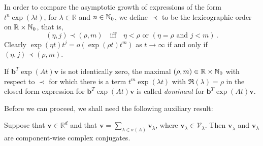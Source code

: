
In order to compare the asymptotic growth of expressions of the form
$t^{n}\exp(\lambda t)$, for $\lambda\in\mathbb{R}$ and
$n\in\mathbb{N}_0$, we define $\prec$ to be the lexicographic order on
$\mathbb{R}\times\mathbb{N}_{0}$, that is,
\begin{equation*}
(\eta,j)\prec (\rho,m) \quad \mbox{iff} \quad
\eta<\rho \mbox{ or } (\eta = \rho \mbox{ and } j< m) \, .
\end{equation*}
Clearly $\exp(\eta t)t^{j}=o(\exp(\rho t)t^{m})$ as $t\rightarrow \infty$ if and only if $(\eta,j)\prec (\rho,m)$.

\begin{definition}
If $\boldsymbol{b}^{T}\exp(At)\boldsymbol{v}$ is not identically zero,
the maximal $(\rho,m)\in\mathbb{R}\times\mathbb{N}_{0}$ with respect
to $\prec$ for which there is a term $t^{m}\exp (\lambda t)$ with
$\Re(\lambda)=\rho$ in the closed-form expression for
$\boldsymbol{b}^{T}\exp(At)\boldsymbol{v}$ is called \emph{dominant} for
$\boldsymbol{b}^{T}\exp(At)\boldsymbol{v}$.
\end{definition}

Before we can proceed, we shall need the following auxiliary result:

\begin{proposition}
\label{conj-relation}
Suppose that $\boldsymbol{v}\in\mathbb{R}^{d}$ and that $\boldsymbol{v}=\sum\limits_{\lambda\in\sigma(A)} \boldsymbol{v}_{\lambda}$, where $\boldsymbol{v}_{\lambda} \in\mathcal{V}_{\lambda}$. Then $\boldsymbol{v}_{\overline{\lambda}}$ and $\boldsymbol{v}_{\lambda}$ are component-wise complex conjugates.
\end{proposition}

